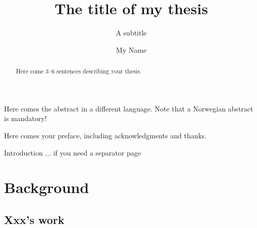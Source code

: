\documentclass[UKenglish,thumbmarks]{uiophdthesis}   %
\title{The title of my thesis}        %
\subtitle{A subtitle}                 %
\author{My Name}                      %
\begin{document}
\frontmatter{}
\maketitle[
  supervisor={A Supervisor},
]

\begin{abstract}
  Here come 3--6 sentences describing your thesis.
\end{abstract}
\begin{xabstract}[Sammendrag]               %
  Here comes the abstract in a different language.
  Note that a Norwegian abstract is mandatory!
\end{xabstract}

\tableofcontents{}                          %
\listoffigures{}                            %
\listoftables{}                             %

\begin{preface}
  Here comes your preface, including acknowledgments and thanks.
\end{preface}

\mainmatter{}
\begin{uioseparatorpage}{Introduction}  %
  ... if you need a separator page
\end{uioseparatorpage}

\chapter{Background}                  %
\section{Xxx's work}                  %

\end{document}
